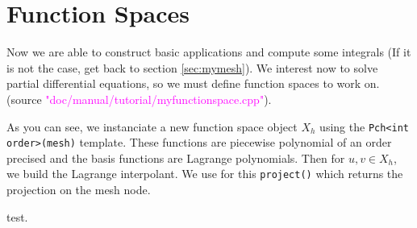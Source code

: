 %
\section{Function Spaces}
\label{sec:myfunctionspace}

Now we are able to construct basic \feel applications and compute some integrals 
(If it is not the case, get back to section \ref{sec:mymesh}).
We interest now to solve partial differential equations, so we must define function spaces
to work on. (source \textcolor{magenta}{"doc/manual/tutorial/myfunctionspace.cpp"}).

\vspace{2mm}

\vspace{2mm}

As you can see, we instanciate a new function space object $X_h$ using the \lstinline!Pch<int order>(mesh)!
template. These functions are piecewise polynomial of an order precised and the basis functions are
Lagrange polynomials. Then for $u,v\in X_h$, we build the Lagrange interpolant. We use for this
\lstinline!project()! which returns the projection on the mesh node.

test.


